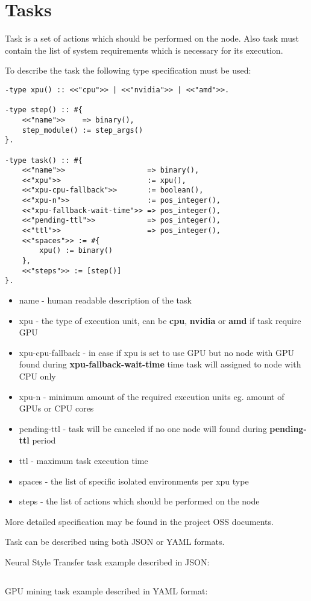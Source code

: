 \section{Tasks}

Task is a set of actions which should be performed on the node.
Also task must contain the list of system requirements which is necessary for its execution.

To describe the task the following type specification must be used:

\begin{verbatim}
-type xpu() :: <<"cpu">> | <<"nvidia">> | <<"amd">>.

-type step() :: #{
    <<"name">>    => binary(),
    step_module() := step_args()
}.

-type task() :: #{
    <<"name">>                   => binary(),
    <<"xpu">>                    := xpu(),
    <<"xpu-cpu-fallback">>       := boolean(),
    <<"xpu-n">>                  := pos_integer(),
    <<"xpu-fallback-wait-time">> => pos_integer(),
    <<"pending-ttl">>            => pos_integer(),
    <<"ttl">>                    => pos_integer(),
    <<"spaces">> := #{
        xpu() := binary()
    },
    <<"steps">> := [step()]
}.
\end{verbatim}

\begin{itemize}
    \item name - human readable description of the task
    \item xpu - the type of execution unit, can be \textbf{cpu}, \textbf{nvidia} or \textbf{amd} if task require GPU
    \item xpu-cpu-fallback - in case if xpu is set to use GPU but no node with GPU found during \textbf{xpu-fallback-wait-time} time task will assigned to node with CPU only
    \item xpu-n - minimum amount of the required execution units eg. amount of GPUs or CPU cores
    \item pending-ttl - task will be canceled if no one node will found during \textbf{pending-ttl} period
    \item ttl - maximum task execution time
    \item spaces - the list of specific isolated environments per xpu type
    \item steps - the list of actions which should be performed on the node
\end{itemize}

More detailed specification may be found in the project OSS\cite{oss} documents.

Task can be described using both JSON or YAML formats.

\newpage
Neural Style Transfer task example described in JSON:

\inputminted{json}{neural-style-task.json}

\newpage
GPU mining task example described in YAML format:

\inputminted{yaml}{claymore-cuda-mining-task.yaml}
